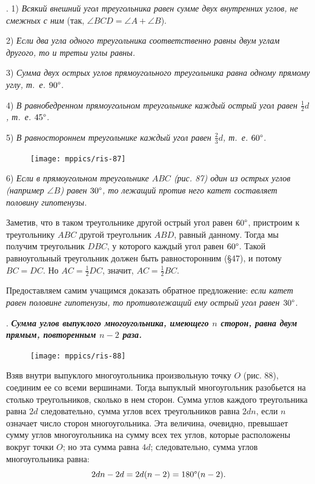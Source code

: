 \documentclass[oneside]{book}
\begin{document}
.
1) \emph{Всякий внешний угол треугольника равен сумме двух внутренних углов, не смежных с ним} (так, $\angle BCD = \angle A + \angle B$).

2) \emph{Если два угла одного треугольника соответственно равны двум углам другого, то и третьи углы равны.}

3) \emph{Сумма двух острых углов прямоугольного треугольника равна одному прямому углу, т.~е. $90\degree$.}

4) \emph{В равнобедренном прямоугольном треугольнике каждый острый угол равен $\tfrac12 d$, т.~е. $45\degree$.}

5) \emph{В равностороннем треугольнике каждый угол равен $\tfrac23d$, т.~е. $60\degree$.}

\begin{figure}
\centering
\texttt{[image: mppics/ris-87]}
\caption{}
\end{figure}

6) \emph{Если в прямоугольном треугольнике $ABC$ \emph{(рис. 87)} один из острых углов \emph{(например $\angle B$)} равен $30\degree$, то лежащий против него катет составляет половину гипотенузы.}

Заметив, что в таком треугольнике другой острый угол равен $60\degree$, пристроим к треугольнику $ABC$ другой треугольник $ABD$, равный данному.
Тогда мы получим треугольник $DBC$, у которого каждый угол равен $60\degree$.
Такой равноугольный треугольник должен быть равносторонним (§47), и потому $BC=DC$.
Но $AC=\tfrac12DC$, значит, $AC=\tfrac12BC$.

Предоставляем самим учащимся доказать обратное предложение:
\emph{если катет равен половине гипотенузы, то противолежащий ему острый угол равен $30\degree$.}

.
\textbf{\emph{Сумма углов выпуклого многоугольника, имеющего $n$ сторон, равна двум прямым, повторенным $n-2$ раза.}}

\begin{figure}
\centering
\texttt{[image: mppics/ris-88]}
\caption{}
\end{figure}

Взяв внутри выпуклого многоугольника произвольную точку $O$ (рис. 88), соединим ее со всеми вершинами.
Тогда выпуклый многоугольник разобьется на столько треугольников, сколько в нем сторон.
Сумма углов каждого треугольника равна $2d$ следовательно, сумма углов всех треугольников равна $2dn$, если $n$ означает число сторон многоугольника.
Эта величина, очевидно, превышает сумму углов многоугольника на сумму всех тех углов, которые расположены вокруг точки $O$;
но эта сумма равна $4d$;
следовательно, сумма углов многоугольника равна:
\[2dn -2d= 2d(n - 2) = 180\degree(n - 2).\]
\end{document}

